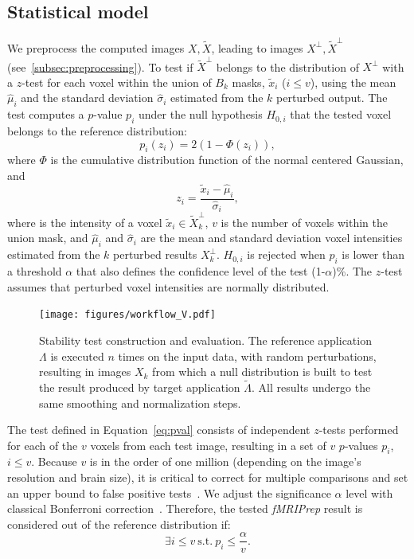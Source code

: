 \documentclass[lettersize,journal]{IEEEtran}
\newcommand{\fmriprep}{\emph{fMRIPrep}\xspace}
\begin{document}
{\subsection{Statistical model}

We preprocess the computed images $X,\tilde X$, leading to images $X^\perp, \tilde X^\perp$ (see~\ref{subsec:preprocessing}). To test if $\tilde X^\perp$ belongs to the distribution of $X^\perp$ with a $z$-test for each voxel within the union of $B_k$ masks, $\tilde x_i$ ($i\leq v$), using the mean $\hat \mu_i$ and the standard deviation $\hat \sigma_i$ estimated from the $k$ perturbed output.
The test computes a $p$-value $p_i$ under the null hypothesis $H_{0,i}$ that the tested voxel belongs to the reference distribution:
\begin{equation} \label{eq:pval}
  p_i(z_i) = 2 \left(1-\Phi(z_i)\right),
\end{equation}
where $\Phi$ is the cumulative distribution function of the normal centered Gaussian, and
\begin{equation*}
  z_i = \frac{\tilde x_i-\hat \mu_i}{\hat \sigma_i},
\end{equation*}
where is the intensity of a voxel $\tilde x_i \in \tilde X_k^\perp$, $v$ is the number of voxels within the union mask,
and $\hat \mu_i$ and $\hat \sigma_i$ are the mean and standard deviation voxel intensities estimated
from the $k$ perturbed results $X_k^\perp$.
$H_{0,i}$ is rejected when $p_i$ is lower than a threshold $\alpha$ that also defines the confidence level of the test (1-$\alpha$)\%.
The $z$-test assumes that perturbed voxel intensities are normally distributed.

\begin{figure}
  \centering
  \texttt{[image: figures/workflow\_V.pdf]}
  \caption{Stability test construction and evaluation. The reference application $\Lambda$ is executed $n$ times on the input data, with random perturbations, resulting in images $X_k$ from which a null distribution is built to test the result produced by target application $\tilde \Lambda$. All results undergo the same smoothing and normalization steps.}
  \label{fig:test_workflow}
\end{figure}


The test defined in Equation~\ref{eq:pval} consists of independent $z$-tests performed for each of the $v$ voxels
from each test image, resulting in a set of $v$ $p$-values $p_i$, $i \leq v$.
Because $v$ is in the order of one million (depending on the image's resolution and brain size), it is critical
to correct for multiple comparisons and set an upper bound to false positive tests~\cite{NICHOLS2007246}.
We adjust the significance $\alpha$ level with classical Bonferroni correction~\cite{farcomeni2008review}.
Therefore, the tested \fmriprep result is considered out of the reference distribution if:
\begin{equation}
  \label{eq:bonferroni}
  \exists i \leq v \ \text{s.t.} \ p_i \leq \frac{\alpha}{v}.
\end{equation}




}
\end{document}
